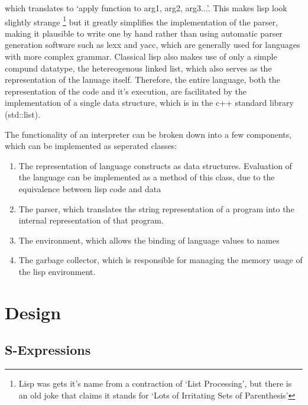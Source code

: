 \documentclass[12pt]{article}
\begin{document}
which translates to `apply function to arg1, arg2, arg3...'. This makes lisp look slightly strange
\footnote{Lisp was gets it's name from a contraction of `List Processing', but there is an old joke that claims it stands for
 `Lots of Irritating Sets of Parenthesis'} 
but it greatly simplifies the implementation of the parser, making it plausible to write one by hand rather than 
using automatic parser generation software such as lexx and yacc, which are generally used for languages with more complex grammar. Classical lisp
also makes use of only a simple compund datatype, the hetereogenous linked list, which also serves as the representation of the lanuage itself. 
Therefore, the entire language, both the representation of the code and it's execution, are facilitated by the implementation of a single data structure, 
which is in the c++ standard library (std::list).

The functionality of an interpreter can be broken down into a few components, which can be implemented as seperated classes: 
\begin{enumerate}
\item The representation of language constructs as data structures. Evaluation of the language can be implemented as a method of this class, due to the 
equivalence between lisp code and data 
\item The parser, which translates the string representation of a program into the internal representation of that program. 
\item The environment, which allows the binding of language values to names
\item The garbage collector, which is responsible for managing the memory usage of the lisp environment.
\end{enumerate}

\section{Design} 
\subsection{S-Expressions} 
\label{section:sexp}
\end{document}

